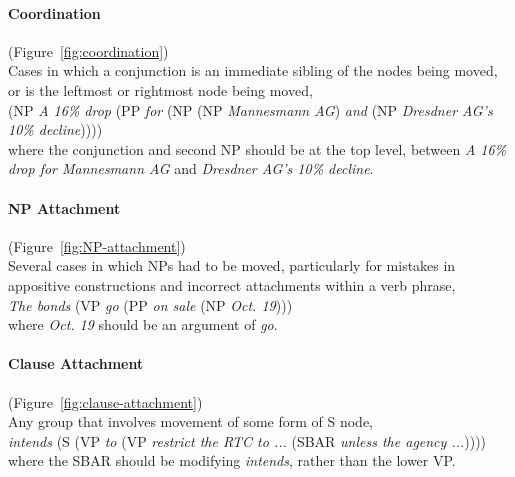 \begin{figure}
\centering

\end{figure}

\paragraph{Coordination} (Figure~\ref{fig:coordination}) \\
Cases in which a conjunction is an immediate sibling of the nodes being moved, or is the leftmost or rightmost node being moved, \myeg \\
(NP \emph{A 16\% drop} (PP \emph{for} (NP (NP \emph{Mannesmann AG}) \emph{and} (NP \emph{Dresdner AG's 10\% decline})))) \\
where the conjunction and second NP should be at the top level, between \emph{A 16\% drop for Mannesmann AG} and \emph{Dresdner AG's 10\% decline}.

\paragraph{NP Attachment} (Figure~\ref{fig:NP-attachment}) \\
Several cases in which NPs had to be moved, particularly for mistakes in appositive constructions and incorrect attachments within a verb phrase, \myeg \\
\emph{The bonds} (VP \emph{go} (PP \emph{on sale} (NP \emph{Oct.\@\xspace 19}))) \\
where \emph{Oct.\@\xspace 19} should be an argument of \emph{go}.

\paragraph{Clause Attachment} (Figure~\ref{fig:clause-attachment}) \\
Any group that involves movement of some form of S node, \myeg \\
\emph{intends} (S (VP \emph{to} (VP \emph{restrict the RTC to ...\@\xspace} (SBAR \emph{unless the agency ...\@\xspace})))) \\
where the SBAR should be modifying \emph{intends}, rather than the lower VP.

\begin{landscape}
\begin{figure}
\centering
\begin{minipage}[b]{3.5in}
\centering

\end{minipage}\hfill
\begin{minipage}[b]{4.5in}
\centering

\end{minipage}
\end{figure}
\end{landscape}

